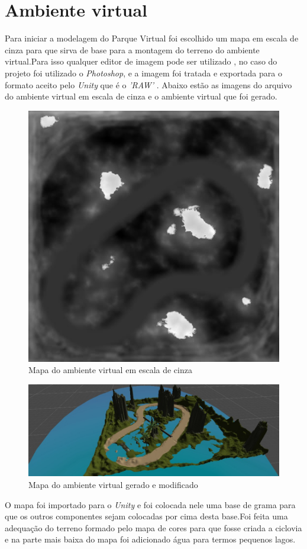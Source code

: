\section{Ambiente virtual}
	Para iniciar a modelagem do Parque Virtual foi escolhido um mapa em escala de 
cinza para que sirva de base para a montagem do terreno do ambiente virtual.Para isso 
qualquer editor de imagem pode ser utilizado , no caso do projeto foi utilizado o \textit{Photoshop},
e a imagem foi tratada e exportada para o formato aceito pelo \textit{Unity} que é o \textit{'RAW'} . Abaixo estão 
as imagens do arquivo do ambiente virtual em escala de cinza e o ambiente virtual que foi gerado.

\begin{figure}[htpb]
 \begin{center}
    \includegraphics[width=.40\textwidth]{figuras/mapa_escala_de_cinza.jpg}
 \end{center}
  \caption{Mapa do ambiente virtual em escala de cinza}
  \label{fig:core_concurrent}
\end{figure}

\begin{figure}[htpb]
 \begin{center}
    \includegraphics[width=.60\textwidth]{figuras/mapa.png}
 \end{center}
  \caption{Mapa do ambiente virtual gerado e modificado}
  \label{fig:core_concurrent}
\end{figure}

O mapa foi importado para o \textit{Unity} e foi colocada nele uma base de grama para que
os outros componentes sejam colocadas por cima desta base.Foi feita uma adequação 
do terreno formado pelo mapa de cores para que fosse criada
a ciclovia e na parte mais baixa do mapa foi adicionado água para termos pequenos 
lagos.

